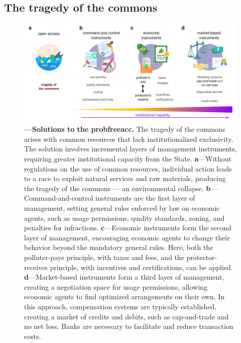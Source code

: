 \documentclass[./main_en.tex]{subfiles}
\begin{document}
\subsection{The tragedy of the commons} \label{subsec:tragedy}

\begin{figure}[t!] 
\centering				
\includegraphics[width=0.98\linewidth]{figs/fig_opensacc_en.jpg}		
\caption[Solutions to the Tragedy of the Commons]
{\textbf{---\;Solutions to the \gls{probfreeacc}.}
    The tragedy of the commons arises with common resources that lack institutionalized exclusivity. The solution involves incremental layers of management instruments, requiring greater institutional capacity from the State.
    \;\textbf{a}\;---\;Without regulations on the use of common resources, individual action leads to a race to exploit natural services and raw materials, producing the tragedy of the commons — an environmental collapse.
    \;\textbf{b}\;---\;Command-and-control instruments are the first layer of management, setting general rules enforced by law on economic agents, such as usage permissions, quality standards, zoning, and penalties for infractions.
    \;\textbf{c}\;---\;Economic instruments form the second layer of management, encouraging economic agents to change their behavior beyond the mandatory general rules. Here, both the polluter-pays principle, with taxes and fees, and the protector-receives principle, with incentives and certifications, can be applied.
    \;\textbf{d}\;---\;Market-based instruments form a third layer of management, creating a negotiation space for usage permissions, allowing economic agents to find optimized arrangements on their own. In this approach, compensation systems are typically established, creating a market of credits and debits, such as cap-and-trade and no net loss. Banks are necessary to facilitate and reduce transaction costs.
}
\label{fig:eco:tragedy} 		
\end{figure}
\end{document}
